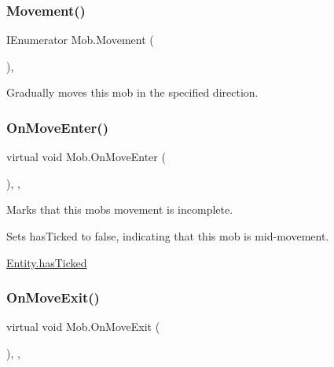 \subsubsection{\texorpdfstring{Movement()}{Movement()}}
{\footnotesize\ttfamily I\+Enumerator Mob.\+Movement (\begin{DoxyParamCaption}{ }\end{DoxyParamCaption})\hspace{0.3cm}{\ttfamily [inline]}, {\ttfamily [protected]}}



Gradually moves this mob in the specified direction. 

\mbox{\label{class_mob_afe18435e81a113484d2b38a6c91eba1a}} 
\subsubsection{\texorpdfstring{On\+Move\+Enter()}{OnMoveEnter()}}
{\footnotesize\ttfamily virtual void Mob.\+On\+Move\+Enter (\begin{DoxyParamCaption}{ }\end{DoxyParamCaption})\hspace{0.3cm}{\ttfamily [inline]}, {\ttfamily [protected]}, {\ttfamily [virtual]}}



Marks that this mob\textquotesingle{}s movement is incomplete. 

Sets has\+Ticked to false, indicating that this mob is mid-\/movement. 

\mbox{\hyperlink{class_entity_a5c863af2a4933e264e30be69644c749e}{Entity.\+has\+Ticked}} \mbox{\label{class_mob_aa523ff737b0324ec092670280d528c58}} 
\subsubsection{\texorpdfstring{On\+Move\+Exit()}{OnMoveExit()}}
{\footnotesize\ttfamily virtual void Mob.\+On\+Move\+Exit (\begin{DoxyParamCaption}{ }\end{DoxyParamCaption})\hspace{0.3cm}{\ttfamily [inline]}, {\ttfamily [protected]}, {\ttfamily [virtual]}}



